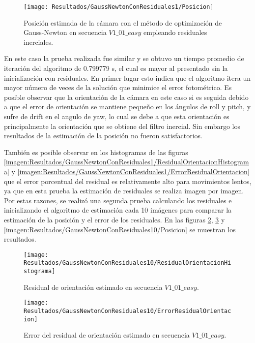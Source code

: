\begin{figure}[H]
	\centering
	\texttt{[image: Resultados/GaussNewtonConResiduales1/Posicion]}
	\caption{Posición estimada de la cámara con el método de optimización de Gauss-Newton en secuencia $V1\_ 01\_ easy$ empleando residuales inerciales. }
	\label{imagen:Resultados/GaussNewtonConResiduales1/Posicion}
\end{figure}

En este caso la prueba realizada fue similar y se obtuvo un tiempo promedio de iteración del algoritmo de 0.799779 s, el cual es mayor al presentado sin la inicialización con residuales. En primer lugar esto indica que el algoritmo itera un mayor número de veces de la solución que minimice el error fotométrico. Es posible observar que la orientación de la cámara en este caso si es seguida debido a que el error de orientación se mantiene pequeño en los ángulos de roll y pitch, y sufre de drift en el angulo de yaw, lo cual se debe a que esta orientación es principalmente la orientación que se obtiene del filtro inercial. Sin embargo los resultados de la estimación de la posición no fueron satisfactorios.

También es posible observar en los histogramas de las figuras \ref{imagen:Resultados/GaussNewtonConResiduales1/ResidualOrientacionHistograma} y \ref{imagen:Resultados/GaussNewtonConResiduales1/ErrorResidualOrientacion} que el error porcentual del residual es relativamente alto para movimientos lentos, ya que en esta prueba la estimación de residuales se realiza imagen por imagen. Por estas razones, se realizó una segunda prueba calculando los residuales e inicializando el algoritmo de estimación cada 10 imágenes para comparar la estimación de la posición y el error de los residuales. En las figuras  \ref{imagen:Resultados/GaussNewtonConResiduales10/ResidualOrientacionHistograma}, \ref{imagen:Resultados/GaussNewtonConResiduales10/ErrorResidualOrientacion} y \ref{imagen:Resultados/GaussNewtonConResiduales10/Posicion} se muestran los resultados.

\begin{figure}[H]
	\centering
	\texttt{[image: Resultados/GaussNewtonConResiduales10/ResidualOrientacionHistograma]}
	\caption{ Residual de orientación estimado en secuencia $V1\_ 01\_ easy$.}
	\label{imagen:Resultados/GaussNewtonConResiduales10/ResidualOrientacionHistograma}
\end{figure}

\begin{figure}[H]
	\centering
	\texttt{[image: Resultados/GaussNewtonConResiduales10/ErrorResidualOrientacion]}
	\caption{ Error del residual de orientación estimado en secuencia $V1\_ 01\_ easy$.}
	\label{imagen:Resultados/GaussNewtonConResiduales10/ErrorResidualOrientacion}
\end{figure}


